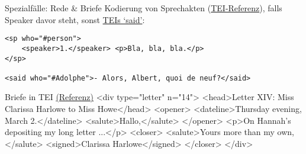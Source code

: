 \begin{frame}{Spezialfälle: Rede \& Briefe}
\footnotesize
Kodierung von Sprechakten  (\href{http://www.tei-c.org/release/doc/tei-p5-doc/en/html/examples-sp.html}{TEI-Referenz}), falls Speaker davor steht, sonst \href{http://www.tei-c.org/release/doc/tei-p5-doc/en/html/examples-said.html}{TEIs `said'}:
\begin{verbatim}
<sp who="#person">
    <speaker>1.</speaker> <p>Bla, bla, bla.</p>
</sp>

<said who="#Adolphe">- Alors, Albert, quoi de neuf?</said>
\end{verbatim}

\begin{myxml}{Briefe in TEI \href{http://www.tei-c.org/release/doc/tei-p5-doc/en/html/DS.html#DSOC}{(Referenz)}}
<div type="letter" n="14">
    <head>Letter XIV: Miss Clarissa Harlowe to Miss Howe</head>
        <opener>
            <dateline>Thursday evening, March 2.</dateline>
            <salute>Hallo,</salute>
        </opener>
    <p>On Hannah's depositing my long letter ...</p>
    <closer>
        <salute>Yours more than my own,</salute>
        <signed>Clarissa Harlowe</signed>
    </closer>
</div>
\end{myxml}
\end{frame}

